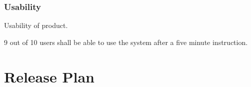 \documentclass[10pt,a4paper]{article}
\begin{document}
\subsubsection{Usability}
Usability of product.
\begin{description}
	\item [Req \thesubsubsection {.\theusab} User friendly] 9 out of 10 users shall be able to use the system after a five minute instruction.
\end{description}









\section{Release Plan}
\end{document}
